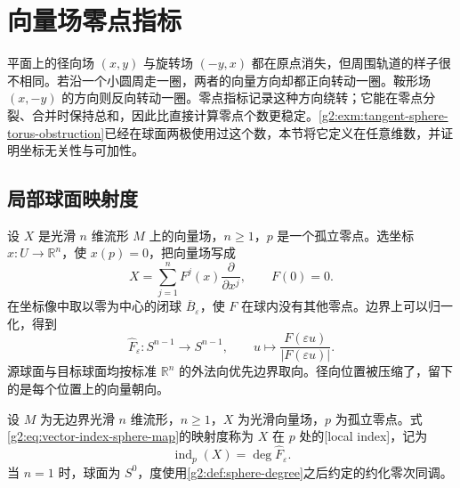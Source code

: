 
% 
% 

\section{向量场零点指标}
\label{g2:sec:1603}

平面上的径向场 \((x,y)\) 与旋转场 \((-y,x)\) 都在原点消失，但周围轨道的样子很不相同。若沿一个小圆周走一圈，两者的向量方向却都正向转动一圈。鞍形场 \((x,-y)\) 的方向则反向转动一圈。零点指标记录这种方向绕转；它能在零点分裂、合并时保持总和，因此比直接计算零点个数更稳定。\cref{g2:exm:tangent-sphere-torus-obstruction}已经在球面两极使用过这个数，本节将它定义在任意维数，并证明坐标无关性与可加性。

\subsection{局部球面映射度}
\label{g2:subsec:1603:01}

设 \(X\) 是光滑 \(n\) 维流形 \(M\) 上的向量场，\(n\ge1\)，\(p\) 是一个孤立零点。选坐标 \(x:U\to\mathbb R^n\)，使 \(x(p)=0\)，把向量场写成
\[
	X=\sum_{j=1}^n F^j(x)\frac{\partial}{\partial x^j},\qquad F(0)=0.
\]
在坐标像中取以零为中心的闭球 \(\overline B_\varepsilon\)，使 \(F\) 在球内没有其他零点。边界上可以归一化，得到
\begin{equation}\label{g2:eq:vector-index-sphere-map}
	\widehat F_\varepsilon:S^{n-1}\longrightarrow S^{n-1},\qquad
	u\longmapsto\frac{F(\varepsilon u)}{|F(\varepsilon u)|}.
\end{equation}
源球面与目标球面均按标准 \(\mathbb R^n\) 的外法向优先边界取向。径向位置被压缩了，留下的是每个位置上的向量朝向。

\begin{definition}\label{g2:def:vector-field-local-index}
	设 \(M\) 为无边界光滑 \(n\) 维流形，\(n\ge1\)，\(X\) 为光滑向量场，\(p\) 为孤立零点。式\eqref{g2:eq:vector-index-sphere-map}的映射度称为 \(X\) 在 \(p\) 处的[local index]，记为
	\[
		\operatorname{ind}_p(X)=\deg\widehat F_\varepsilon.
	\]
	当 \(n=1\) 时，球面为 \(S^0\)，度使用\cref{g2:def:sphere-degree}之后约定的约化零次同调。
\end{definition}

